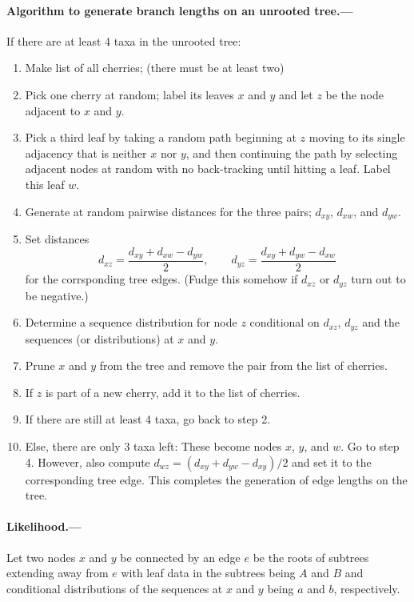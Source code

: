 \documentclass[12pt,letterpaper]{article}
\begin{document}
\paragraph{Algorithm to generate branch lengths on an unrooted tree.---}
If there are at least 4 taxa in the unrooted tree:
\begin{enumerate}
\item Make list of all cherries; (there must be at least two)
\item Pick one cherry at random; label its leaves $x$ and $y$ and let $z$ be the node adjacent to $x$ and $y$.
\item Pick a third leaf by taking a random path beginning at $z$ moving to its single adjacency that is neither $x$ nor $y$,
and then continuing the path by selecting adjacent nodes at random with no back-tracking until hitting a leaf.
Label this leaf $w$.
\item Generate at random pairwise distances for the three pairs; $d_{xy}$, $d_{xw}$, and $d_{yw}$.
\item Set distances
$$
d_{xz} = \frac{d_{xy} + d_{xw} - d_{yw}}{2}, \qquad d_{yz} = \frac{d_{xy} + d_{yw} - d_{xw}}{2}
$$
for the corrsponding tree edges.
(Fudge this somehow if $d_{xz}$ or $d_{yz}$ turn out to be negative.)
\item Determine a sequence distribution for node $z$ conditional on $d_{xz}$, $d_{yz}$ and the sequences (or distributions) at $x$ and $y$.
\item Prune $x$ and $y$ from the tree and remove the pair from the list of cherries.
\item If $z$ is part of a new cherry, add it to the list of cherries.
\item If there are still at least 4 taxa,
go back to step 2.
\item Else, there are only 3 taxa left:
These become nodes $x$, $y$, and $w$.
Go to step 4.
However, also compute $d_{wz} = (d_{xy} + d_{yw} - d_{xy})/2$ and set it to the corresponding tree edge.
This completes the generation of edge lengths on the tree.
\end{enumerate}

\paragraph{Likelihood.---}
Let two nodes $x$ and $y$ be connected by an edge $e$ be the roots of subtrees extending away from $e$
with leaf data in the subtrees being $A$ and $B$
and conditional distributions of the sequences at $x$ and $y$ being $a$ and $b$, respectively.
\end{document}
